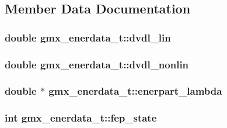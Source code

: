 \subsection{\-Member \-Data \-Documentation}
\hypertarget{structgmx__enerdata__t_a28b7919eb6cff34c46ccce0154a61ec5}{
\subsubsection[{dvdl\-\_\-lin}]{\setlength{\rightskip}{0pt plus 5cm}double {\bf gmx\-\_\-enerdata\-\_\-t\-::dvdl\-\_\-lin}}}\label{structgmx__enerdata__t_a28b7919eb6cff34c46ccce0154a61ec5}
\hypertarget{structgmx__enerdata__t_a0afe5a332088a9876043842092ea4f40}{
\subsubsection[{dvdl\-\_\-nonlin}]{\setlength{\rightskip}{0pt plus 5cm}double {\bf gmx\-\_\-enerdata\-\_\-t\-::dvdl\-\_\-nonlin}}}\label{structgmx__enerdata__t_a0afe5a332088a9876043842092ea4f40}
\hypertarget{structgmx__enerdata__t_ae15355d2b4f473dc873e301108a7ca27}{
\subsubsection[{enerpart\-\_\-lambda}]{\setlength{\rightskip}{0pt plus 5cm}double $\ast$ {\bf gmx\-\_\-enerdata\-\_\-t\-::enerpart\-\_\-lambda}}}\label{structgmx__enerdata__t_ae15355d2b4f473dc873e301108a7ca27}
\hypertarget{structgmx__enerdata__t_a223087a8cb456d8f3b3427a9add0a4a2}{
\subsubsection[{fep\-\_\-state}]{\setlength{\rightskip}{0pt plus 5cm}int {\bf gmx\-\_\-enerdata\-\_\-t\-::fep\-\_\-state}}}\label{structgmx__enerdata__t_a223087a8cb456d8f3b3427a9add0a4a2}
